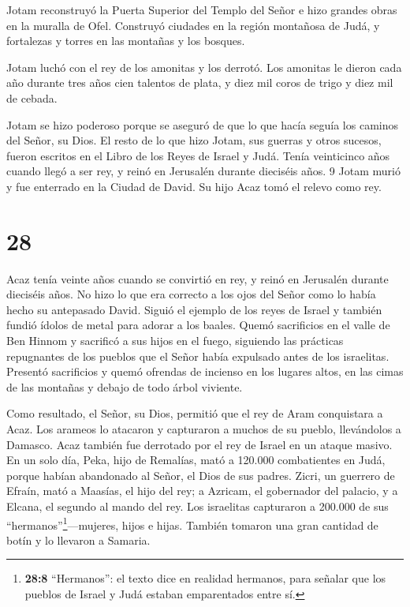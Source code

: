  Jotam reconstruyó la Puerta Superior del Templo del Señor e
hizo grandes obras en la muralla de Ofel.  Construyó
ciudades en la región montañosa de Judá, y fortalezas y torres en las
montañas y los bosques.

 Jotam luchó con el rey de los amonitas y los derrotó. Los
amonitas le dieron cada año durante tres años cien talentos de plata, y
diez mil coros de trigo y diez mil de cebada.

 Jotam se hizo poderoso porque se aseguró de que lo que
hacía seguía los caminos del Señor, su Dios.  El resto de lo
que hizo Jotam, sus guerras y otros sucesos, fueron escritos en el Libro
de los Reyes de Israel y Judá.  Tenía veinticinco años
cuando llegó a ser rey, y reinó en Jerusalén durante dieciséis años. 9
Jotam murió y fue enterrado en la Ciudad de David. Su hijo Acaz tomó el
relevo como rey.

\hypertarget{section-27}{%
\section{28}\label{section-27}}

 Acaz tenía veinte años cuando se convirtió en rey, y reinó
en Jerusalén durante dieciséis años. No hizo lo que era correcto a los
ojos del Señor como lo había hecho su antepasado David. 
Siguió el ejemplo de los reyes de Israel y también fundió ídolos de
metal para adorar a los baales.  Quemó sacrificios en el
valle de Ben Hinnom y sacrificó a sus hijos en el fuego, siguiendo las
prácticas repugnantes de los pueblos que el Señor había expulsado antes
de los israelitas.  Presentó sacrificios y quemó ofrendas de
incienso en los lugares altos, en las cimas de las montañas y debajo de
todo árbol viviente.

 Como resultado, el Señor, su Dios, permitió que el rey de
Aram conquistara a Acaz. Los arameos lo atacaron y capturaron a muchos
de su pueblo, llevándolos a Damasco. Acaz también fue derrotado por el
rey de Israel en un ataque masivo.  En un solo día, Peka,
hijo de Remalías, mató a 120.000 combatientes en Judá, porque habían
abandonado al Señor, el Dios de sus padres.  Zicri, un
guerrero de Efraín, mató a Maasías, el hijo del rey; a Azricam, el
gobernador del palacio, y a Elcana, el segundo al mando del rey.
 Los israelitas capturaron a 200.000 de sus
``hermanos''\footnote{\textbf{28:8} ``Hermanos'': el texto dice en
  realidad hermanos, para señalar que los pueblos de Israel y Judá
  estaban emparentados entre sí.}---mujeres, hijos e hijas. También
tomaron una gran cantidad de botín y lo llevaron a Samaria.

